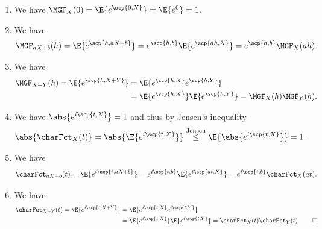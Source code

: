 \begin{solution}
    \begin{enumerate}[wide=0pt, noitemsep]
    \item[\ref{it: (mgf) zero}] We have
    \(\MGF_X(0) = \E{e^{\scp{0, X}}} = \E{e^0} = 1\).
    \item[\ref{it: (mgf) linear transformation}] We have
    \[
        \MGF_{aX + b}(h) = \E{e^{\scp{h, aX + b}}}
        = e^{\scp{h, b}} \E{e^{\scp{a h, X}}}
        = e^{\scp{h,b}} \MGF_X(a h).
    \]
    \item[\ref{it: (mgf) idependent sum}] We have
    \[
    \begin{aligned}
        \MGF_{X+Y}(h) = \E{e^{\scp{h, X+Y}}}
        &= \E{e^{\scp{h, X}} e^{\scp{h, Y}}}
        \\
        &= \E{e^{\scp{h, X}}} \E{e^{\scp{h, Y}}}
        = \MGF_X(h) \MGF_Y(h).
    \end{aligned}
    \]

    \item[\ref{it: (charfct) bounded}] We have \(\abs{e^{i\scp{t, X}}} = 1\) and thus
    by Jensen's inequality
    \[
        \abs{\charFct_X(t)} = \abs{\E{e^{i\scp{t, X}}}} \overset{\text{Jensen}}\le \E{\abs{e^{i\scp{t, X}}}} = 1.
    \]
    \item[\ref{it: (charfct) linear transformation}] We have
    \[
        \charFct_{aX + b}(t) = \E{e^{i\scp{t, aX + b}}}
        = e^{i\scp{t, b}} \E{e^{i\scp{a t, X}}}
        = e^{i\scp{t,b}} \charFct_X(a t).
    \]
    \item[\ref{it: (charfct) independent sum}] We have
    \begin{align*}
        \charFct_{X+Y}(t) = \E{e^{i\scp{t, X+Y}}}
        &= \E{e^{i\scp{t, X}} e^{i\scp{t, Y}}}
        \\
        &= \E{e^{i\scp{t, X}}} \E{e^{i\scp{t, Y}}}
        = \charFct_X(t) \charFct_Y(t).
        \qedhere
    \end{align*}
    \end{enumerate}
\end{solution}

